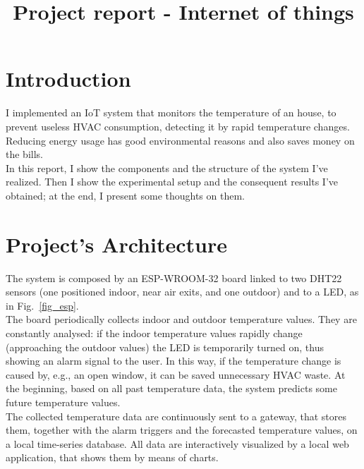 \documentclass[conference]{IEEEtran}
\begin{document}
\title{Project report - Internet of things}

\author{
}

\maketitle


\section{Introduction}
I implemented an IoT system that monitors the temperature of an house, to prevent useless HVAC consumption, detecting it by rapid temperature changes. Reducing energy usage has good environmental reasons and also saves money on the bills.\\
In this report, I show the components and the structure of the system I've realized. Then I show the experimental setup and the consequent results I've obtained; at the end, I present some thoughts on them.


\section{Project’s Architecture}
The system is composed by an ESP-WROOM-32 board linked to two DHT22 sensors (one positioned indoor, near air exits, and one outdoor) and to a LED, as in Fig.~\ref{fig_esp}.\\
The board periodically collects indoor and outdoor temperature values. They are constantly analysed: if the indoor temperature values rapidly change (approaching the outdoor values) the LED is temporarily turned on, thus showing an alarm signal to the user. In this way, if the temperature change is caused by, e.g., an open window, it can be saved unnecessary HVAC waste. At the beginning, based on all past temperature data, the system predicts some future temperature values.\\
The collected temperature data are continuously sent to a gateway, that stores them, together with the alarm triggers and the forecasted temperature values, on a local time-series database. All data are interactively visualized by a local web application, that shows them by means of charts.
\end{document}

